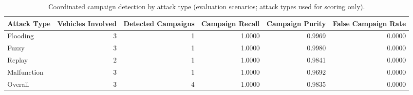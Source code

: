 \begin{table}[t]
\centering
\begin{tabular}{lrrrrr}
\toprule
Attack Type & Vehicles Involved & Detected Campaigns & Campaign Recall & Campaign Purity & False Campaign Rate \\
\midrule
Flooding & 3 & 1 & 1.0000 & 0.9969 & 0.0000 \\
Fuzzy & 3 & 1 & 1.0000 & 0.9980 & 0.0000 \\
Replay & 2 & 1 & 1.0000 & 0.9841 & 0.0000 \\
Malfunction & 3 & 1 & 1.0000 & 0.9692 & 0.0000 \\
Overall & 3 & 4 & 1.0000 & 0.9835 & 0.0000 \\
\bottomrule
\end{tabular}
\caption{Coordinated campaign detection by attack type (evaluation scenarios; attack types used for scoring only).}
\label{tab:coordinated-campaign-detection}
\end{table}

